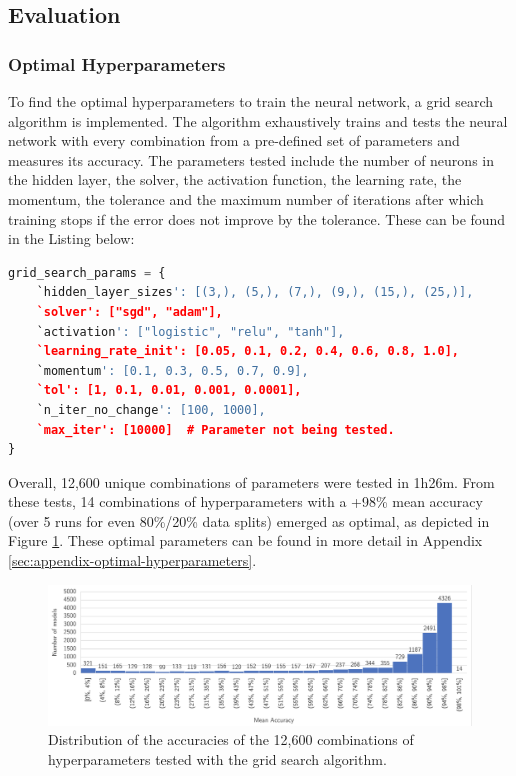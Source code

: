 \documentclass[letterpaper,12pt]{article}
\begin{document}

\subsection{Evaluation}
\label{sec:evaluation}

\subsubsection{Optimal Hyperparameters}
\label{sec:optimal-hyperparams}

To find the optimal hyperparameters to train the neural network, a grid search algorithm is implemented. The algorithm exhaustively trains and tests the neural network with every combination from a pre-defined set of parameters and measures its accuracy. The parameters tested include the number of neurons in the hidden layer, the solver, the activation function, the learning rate, the momentum, the tolerance and the maximum number of iterations after which training stops if the error does not improve by the tolerance. These can be found in the Listing below:

\begin{lstlisting}[language=Python]
grid_search_params = {
    `hidden_layer_sizes': [(3,), (5,), (7,), (9,), (15,), (25,)],
    `solver': ["sgd", "adam"],
    `activation': ["logistic", "relu", "tanh"],
    `learning_rate_init': [0.05, 0.1, 0.2, 0.4, 0.6, 0.8, 1.0],
    `momentum': [0.1, 0.3, 0.5, 0.7, 0.9],
    `tol': [1, 0.1, 0.01, 0.001, 0.0001],
    `n_iter_no_change': [100, 1000],
    `max_iter': [10000]  # Parameter not being tested.
}
\end{lstlisting}

Overall, 12,600 unique combinations of parameters were tested in 1h26m. From these tests, 14 combinations of hyperparameters with a +98\% mean accuracy (over 5 runs for even 80\%/20\% data splits) emerged as optimal, as depicted in Figure \ref{fig:gridsearch_results}. These optimal parameters can be found in more detail in Appendix \ref{sec:appendix-optimal-hyperparameters}.

\clearpage

\begin{figure}[h] 
\centerline{\includegraphics[width=\textwidth]{report/figures/gridsearch_results.png}}
\caption{\label{fig:gridsearch_results}Distribution of the accuracies of the 12,600 combinations of hyperparameters tested with the grid search algorithm.}
\end{figure}
\end{document}
